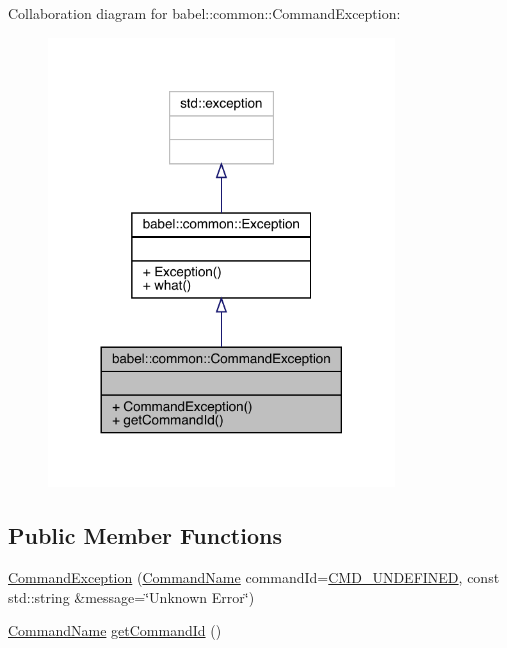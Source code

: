 Collaboration diagram for babel\+:\+:common\+:\+:Command\+Exception\+:\nopagebreak
\begin{figure}[H]
\begin{center}
\leavevmode
\includegraphics[width=260pt]{classbabel_1_1common_1_1_command_exception__coll__graph}
\end{center}
\end{figure}
\subsection*{Public Member Functions}
\begin{DoxyCompactItemize}
\item 
\mbox{\hyperlink{classbabel_1_1common_1_1_command_exception_a5804b444c64ce4dece4388ea290f28be}{Command\+Exception}} (\mbox{\hyperlink{namespacebabel_1_1common_a2d31f246c776da6bf656bd71e86cbb2c}{Command\+Name}} command\+Id=\mbox{\hyperlink{namespacebabel_1_1common_a2d31f246c776da6bf656bd71e86cbb2ca452461e4930e2af5d48e5d2f3eecf98f}{C\+M\+D\+\_\+\+U\+N\+D\+E\+F\+I\+N\+ED}}, const std\+::string \&message=\char`\"{}Unknown Error\char`\"{})
\item 
\mbox{\hyperlink{namespacebabel_1_1common_a2d31f246c776da6bf656bd71e86cbb2c}{Command\+Name}} \mbox{\hyperlink{classbabel_1_1common_1_1_command_exception_aed608cb84fccdc4bb56a072fb7a8a58c}{get\+Command\+Id}} ()
\end{DoxyCompactItemize}


